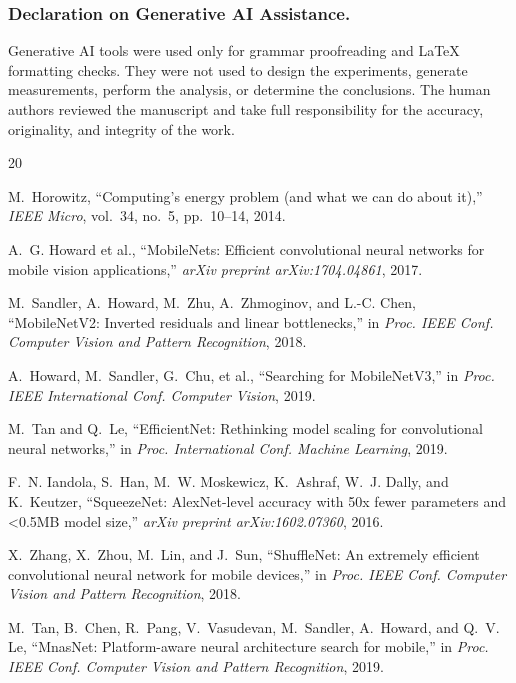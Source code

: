\documentclass{svproc}
\begin{document}
\subsubsection{Declaration on Generative AI Assistance.}
\begin{sloppypar}
Generative AI tools were used only for grammar proofreading and LaTeX
formatting checks. They were not used to design the experiments, generate
measurements, perform the analysis, or determine the conclusions. The human
authors reviewed the manuscript and take full responsibility for the accuracy,
originality, and integrity of the work.
\end{sloppypar}

\begin{thebibliography}{20}

M.~Horowitz, ``Computing's energy problem (and what we can do about it),''
\emph{IEEE Micro}, vol.~34, no.~5, pp.~10--14, 2014.

A.~G. Howard et al., ``MobileNets: Efficient convolutional neural networks for
mobile vision applications,'' \emph{arXiv preprint arXiv:1704.04861}, 2017.

M.~Sandler, A.~Howard, M.~Zhu, A.~Zhmoginov, and L.-C. Chen,
``MobileNetV2: Inverted residuals and linear bottlenecks,'' in
\emph{Proc. IEEE Conf. Computer Vision and Pattern Recognition}, 2018.

A.~Howard, M.~Sandler, G.~Chu, et al., ``Searching for MobileNetV3,'' in
\emph{Proc. IEEE International Conf. Computer Vision}, 2019.

M.~Tan and Q.~Le, ``EfficientNet: Rethinking model scaling for convolutional
neural networks,'' in \emph{Proc. International Conf. Machine Learning}, 2019.

F.~N. Iandola, S.~Han, M.~W. Moskewicz, K.~Ashraf, W.~J. Dally, and
K.~Keutzer, ``SqueezeNet: AlexNet-level accuracy with 50x fewer parameters and
<0.5MB model size,'' \emph{arXiv preprint arXiv:1602.07360}, 2016.

X.~Zhang, X.~Zhou, M.~Lin, and J.~Sun, ``ShuffleNet: An extremely efficient
convolutional neural network for mobile devices,'' in \emph{Proc. IEEE Conf.
Computer Vision and Pattern Recognition}, 2018.

M.~Tan, B.~Chen, R.~Pang, V.~Vasudevan, M.~Sandler, A.~Howard, and Q.~V. Le,
``MnasNet: Platform-aware neural architecture search for mobile,'' in
\emph{Proc. IEEE Conf. Computer Vision and Pattern Recognition}, 2019.


\end{thebibliography}
\end{document}
